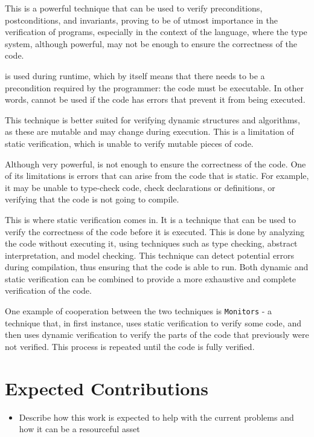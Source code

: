 This is a powerful technique that can be used to verify preconditions, postconditions, and 
invariants, proving to be of utmost importance in the verification of programs, especially 
in the context of the \ocaml language, where the type system, although powerful, may not be 
enough to ensure the correctness of the code.

\rac is used during runtime, which by itself means that there needs to be a precondition required 
by the programmer: the code must be executable. In other words, \rac cannot be used if the code 
has errors that prevent it from being executed.

This technique is better suited for verifying dynamic structures and algorithms, as these are 
mutable and may change during execution. This is a limitation of static verification, which 
is unable to verify mutable pieces of code.

Although very powerful, \rac is not enough to ensure the correctness of the code. One of its 
limitations is errors that can arise from the code that is static. For example, it may be unable 
to type-check code, check declarations or definitions, or verifying that the code is not going to 
compile.

This is where static verification comes in. It is a technique that can be used to verify the 
correctness of the code before it is executed. This is done by analyzing the code without 
executing it, using techniques such as type checking, abstract interpretation, and model checking.
This technique can detect potential errors during compilation, thus ensuring that the code is 
able to run. Both dynamic and static verification can be combined to provide a more exhaustive 
and complete verification of the code.

One example of cooperation between the two techniques is \texttt{Monitors} - a technique that, 
in first instance, uses static verification to verify some code, and then uses dynamic verification 
to verify the parts of the code that previously were not verified. This process is repeated until 
the code is fully verified.

\section{Expected Contributions}
\label{sec:expected_Contributions}

\begin{itemize}
    \item Describe how this work is expected to help with the current problems
    and how it can be a resourceful asset
\end{itemize}

